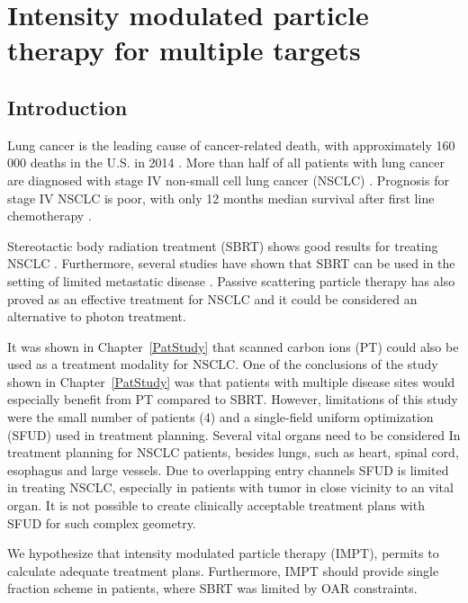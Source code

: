 \chapter{Intensity modulated particle therapy for multiple targets}
\label{chapter:complex}
\minitoc

\section{Introduction}

Lung cancer is the leading cause of cancer-related death, with approximately 160 000 deaths in the U.S. in 2014 \cite{Siegel2014}.
More than half of all patients with lung cancer are diagnosed with stage IV non-small cell lung cancer (NSCLC) \cite{Ramalingam2008, Iyengar2014}.
Prognosis for stage IV NSCLC is poor, with only 12 months median survival after first line chemotherapy \cite{Socinski2013}. 

Stereotactic body radiation treatment (SBRT) shows good results for treating NSCLC \cite{Baumann2009, Fakiris2009, Grutters2010, Greco2011}. 
Furthermore, several studies have shown that SBRT can be used in the setting of limited metastatic 
disease \cite{Rusthoven2009, Villaruz2012, Salama2012, Iyengar2014}. 
Passive scattering particle therapy has also proved as an effective treatment for NSCLC \cite{Grutters2010, Tsujii2012} and it could be considered an alternative
to photon treatment.

It was shown in Chapter~\ref{PatStudy} that scanned carbon ions (PT) could also be used as a treatment modality for NSCLC. One of the conclusions of the study shown in Chapter~\ref{PatStudy} 
was that patients with multiple disease sites would especially benefit from PT compared to SBRT. However, limitations of this study were the small number of patients (4) and
a single-field uniform optimization (SFUD) used in treatment planning. Several vital organs need to be considered In treatment planning for NSCLC patients, besides lungs, such as heart, spinal cord, esophagus and large vessels.
Due to overlapping entry channels SFUD is limited in treating NSCLC, especially in patients with tumor in close vicinity to an vital organ.
It is not possible to create clinically acceptable treatment plans with SFUD for such complex geometry.

We hypothesize that intensity modulated particle therapy (IMPT), permits to calculate adequate treatment plans. Furthermore, IMPT 
should provide single fraction scheme in patients, where SBRT was limited by OAR constraints. 

